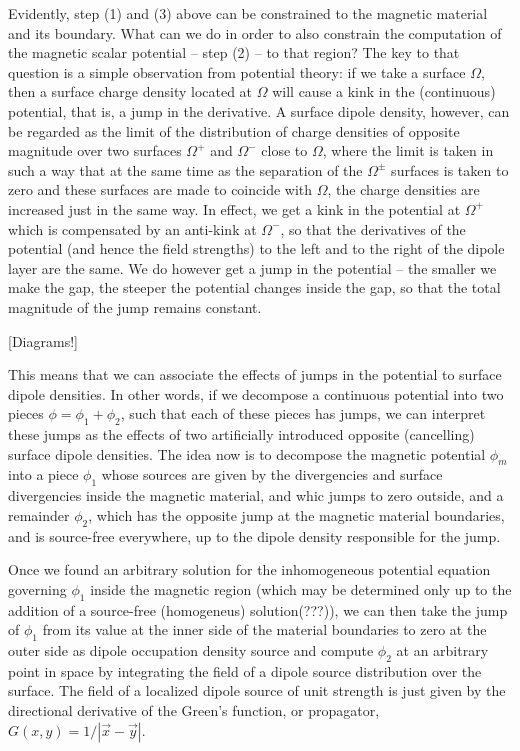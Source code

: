 \documentclass{article}
\begin{document}
Evidently, step (1) and (3) above can be constrained to the magnetic
material and its boundary. What can we do in order to also constrain
the computation of the magnetic scalar potential -- step (2) -- to
that region? The key to that question is a simple observation from
potential theory: if we take a surface $\Omega$, then a surface charge
density located at $\Omega$ will cause a kink in the (continuous)
potential, that is, a jump in the derivative. A surface dipole
density, however, can be regarded as the limit of the distribution of
charge densities of opposite magnitude over two surfaces $\Omega^+$
and $\Omega^-$ close to $\Omega$, where the limit is taken in such a
way that at the same time as the separation of the $\Omega^\pm$
surfaces is taken to zero and these surfaces are made to coincide with
$\Omega$, the charge densities are increased just in the same way. In
effect, we get a kink in the potential at $\Omega^+$ which is
compensated by an anti-kink at $\Omega^-$, so that the derivatives of
the potential (and hence the field strengths) to the left and to the
right of the dipole layer are the same. We do however get a jump in
the potential -- the smaller we make the gap, the steeper the
potential changes inside the gap, so that the total magnitude of the
jump remains constant.

[Diagrams!]

This means that we can associate the effects of jumps in the potential
to surface dipole densities. In other words, if we decompose a
continuous potential into two pieces $\phi=\phi_1+\phi_2$, such that
each of these pieces has jumps, we can interpret these jumps as the
effects of two artificially introduced opposite (cancelling) surface
dipole densities. The idea now is to decompose the magnetic potential
$\phi_m$ into a piece $\phi_1$ whose sources are given by the
divergencies and surface divergencies inside the magnetic material,
and whic jumps to zero outside, and a remainder $\phi_2$, which has
the opposite jump at the magnetic material boundaries, and is
source-free everywhere, up to the dipole density responsible for the
jump.

Once we found an arbitrary solution for the inhomogeneous potential
equation governing $\phi_1$ inside the magnetic region (which may be
determined only up to the addition of a source-free (homogeneus)
solution(???)), we can then take the jump of $\phi_1$ from its value
at the inner side of the material boundaries to zero at the outer side
as dipole occupation density source and compute $\phi_2$ at an
arbitrary point in space by integrating the field of a dipole source
distribution over the surface. The field of a localized dipole source
of unit strength is just given by the directional derivative of the
Green's function, or propagator, $G(x,y)=1/|\vec x-\vec y|$.
\end{document}

